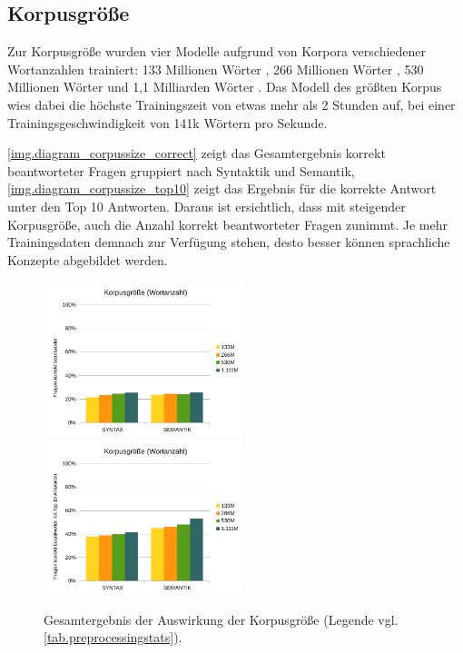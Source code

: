 \subsection{Korpusgröße}
Zur Korpusgröße wurden vier Modelle aufgrund von Korpora verschiedener Wortanzahlen trainiert: 133 Millionen Wörter , 266 Millionen Wörter , 530 Millionen Wörter  und 1,1 Milliarden Wörter . Das Modell des größten Korpus wies dabei die höchste Trainingszeit von etwas mehr als 2 Stunden auf, bei einer Trainingsgeschwindigkeit von 141k Wörtern pro Sekunde.

\autoref{img.diagram_corpussize_correct} zeigt das Gesamtergebnis korrekt beantworteter Fragen gruppiert nach Syntaktik und Semantik, \autoref{img.diagram_corpussize_top10} zeigt das Ergebnis für die korrekte Antwort unter den Top 10 Antworten. Daraus ist ersichtlich, dass mit steigender Korpusgröße, auch die Anzahl korrekt beantworteter Fragen zunimmt. Je mehr Trainingsdaten demnach zur Verfügung stehen, desto besser können sprachliche Konzepte abgebildet werden.

\begin{figure}[H]
\begin{adjustwidth}{-4mm}{-4mm}
\centering
{}
{\includegraphics[width=0.52\textwidth]{images/diagram_corpussize_correct}}
{\includegraphics[width=0.52\textwidth]{images/diagram_corpussize_top10}}
\caption[Gesamtergebnis Korpusgröße]{Gesamtergebnis der Auswirkung der Korpusgröße (Legende vgl. \autoref{tab.preprocessingstats}).}\label{img.diagram_corpussize_all}
\end{adjustwidth}
\end{figure}

